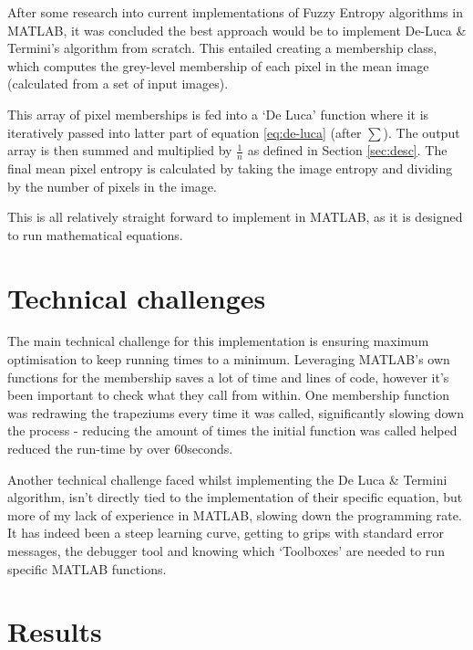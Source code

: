\documentclass[11pt,fleqn,twoside]{article}
\begin{document}
After some research into current implementations of Fuzzy Entropy algorithms in MATLAB, it was concluded the best approach would be to implement De-Luca \& Termini's algorithm from scratch. This entailed creating a membership class, which computes the grey-level membership of each pixel in the mean image (calculated from a set of input images).

This array of pixel memberships is fed into a `De Luca' function where it is iteratively passed into latter part of equation \ref{eq:de-luca} (after $\displaystyle\sum$). The output array is then summed and multiplied by $\frac{1}{n}$ as defined in Section \ref{sec:desc}. The final mean pixel entropy is calculated by taking the image entropy and dividing by the number of pixels in the image.

This is all relatively straight forward to implement in MATLAB, as it is designed to run mathematical equations.


\section{Technical challenges}

The main technical challenge for this implementation is ensuring maximum optimisation to keep running times to a minimum. Leveraging MATLAB's own functions for the membership saves a lot of time and lines of code, however it's been important to check what they call from within. One membership function was redrawing the trapeziums every time it was called, significantly slowing down the process - reducing the amount of times the initial function was called helped reduced the run-time by over 60seconds.

Another technical challenge faced whilst implementing the De Luca \& Termini algorithm, isn't directly tied to the implementation of their specific equation, but more of my lack of experience in MATLAB, slowing down the programming rate. It has indeed been a steep learning curve, getting to grips with standard error messages, the debugger tool and knowing which `Toolboxes' are needed to run specific MATLAB functions.

\newpage
\section{Results}
\end{document}
